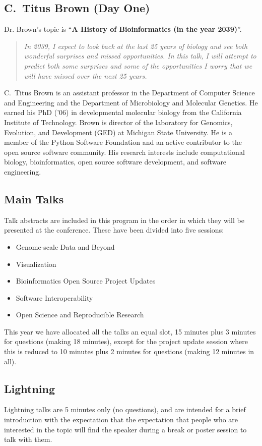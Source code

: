 \documentclass[12pt,oneside]{article}
\begin{document}
\subsection*{C.~Titus Brown (Day One)}
\noindent
Dr. Brown's topic is ``\textbf{A History of Bioinformatics (in the year 2039)}''.
\begin{quote}
\small
\textit{In 2039, I expect to look back at the last 25 years of biology and see
both wonderful surprises and missed opportunities. In this talk, I will attempt
to predict both some surprises and some of the opportunities I worry that we
will have missed over the next 25 years.}
\end{quote}
C.~Titus Brown is an assistant professor in the Department of Computer Science
and Engineering and the Department of Microbiology and Molecular Genetics. He
earned his PhD ('06) in developmental molecular biology from the California
Institute of Technology. Brown is director of the laboratory for Genomics,
Evolution, and Development (GED) at Michigan State University. He is a member
of the Python Software Foundation and an active contributor to the open source
software community. His research interests include computational biology,
bioinformatics, open source software development, and software engineering.

\subsection*{Main Talks}
Talk abstracts are included in this program in the order in which they will
be presented at the conference. These have been divided into five sessions:
\begin{itemize}
\item Genome-scale Data and Beyond
\item Visualization
\item Bioinformatics Open Source Project Updates
\item Software Interoperability
\item Open Science and Reproducible Research
\end{itemize}

This year we have allocated all the talks an equal slot, 15 minutes plus 3
minutes for questions (making 18 minutes), except for the project update
session where this is reduced to 10 minutes plus 2 minutes for questions
(making 12 minutes in all).

\subsection*{Lightning}
Lightning talks are 5 minutes only (no questions), and are intended for a
brief introduction with the expectation that the expectation that people
who are interested in the topic will find the speaker during a break or
poster session to talk with them.
\end{document}
